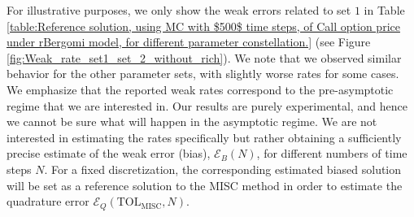 For illustrative purposes, we only show the weak errors related to set $1$ in Table \ref{table:Reference solution, using MC with $500$ time steps, of Call option price under rBergomi model, for different parameter constellation.} (see Figure \ref{fig:Weak_rate_set1_set_2_without_rich}). We note that we observed similar behavior for the other parameter sets, with slightly worse rates for some cases. We emphasize that the reported weak rates correspond to the pre-asymptotic regime that we are interested in. Our results are purely experimental, and hence we cannot be sure what will happen in the asymptotic regime. We are not interested in estimating the rates specifically but rather obtaining  a sufficiently precise estimate of the weak error (bias), $\mathcal{E}_B(N)$, for different  numbers of time steps $N$.  For a fixed discretization, the corresponding estimated biased solution will be set as a reference solution to the  MISC method  in order to estimate the quadrature error $\mathcal{E}_Q(\text{TOL}_{\text{MISC}},N)$.	
\FloatBarrier
